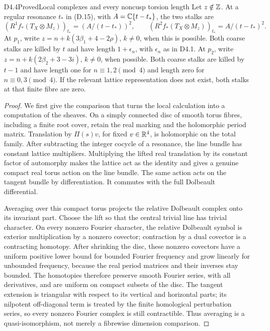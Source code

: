 \begin{claim}{D4.4}{Proved}{Local complexes and every noncusp torsion length}
Let $z\notin\mathbb Z$. At a regular resonance $t_*$ in (D.15), with
$A=\mathbb C\{t-t_*\}$, the two stalks are
\[
 (R^1f_*(T_X\otimes M_z))_{t_*}=(A/(t-t_*))^2,
 \qquad (R^2f_*(T_X\otimes M_z))_{t_*}=A/(t-t_*)^2.    \tag{D.18}
\]
At $p_1$, write $z=n+k(3\beta_1+4-2\rho)$, $k\ne0$, when this is
possible. Both coarse stalks are killed by $t$ and have length
$1+\epsilon_n$, with $\epsilon_n$ as in D4.1.
At $p_2$, write $z=n+k(2\beta_2+3-3i)$, $k\ne0$, when possible.
Both coarse stalks are killed by $t-1$ and have length one for
$n\equiv1,2\pmod4$ and length zero for $n\equiv0,3\pmod4$.
If the relevant lattice representation does not exist, both stalks
at that finite fibre are zero.
\end{claim}
\begin{proof}
We first give the comparison that turns the local calculation into
a computation of the sheaves. On a simply connected disc of smooth
torus fibres, including a finite root cover, retain the real marking
and the holomorphic period matrix. Translation by $\Pi(s)v$, for
fixed $v\in\mathbb R^4$, is holomorphic on the total family. After
subtracting the integer cocycle of a resonance, the line bundle has
constant lattice multipliers. Multiplying the lifted real translation
by its constant factor of automorphy makes the lattice act as the
identity and gives a genuine compact real torus action on the line
bundle. The same action acts on the tangent bundle by differentiation.
It commutes with the full Dolbeault differential.

Averaging over this compact torus projects the relative Dolbeault
complex onto its invariant part. Choose the lift so that the central
trivial line has trivial character. On every nonzero Fourier character,
the relative Dolbeault symbol is exterior multiplication by a
nonzero covector; contraction by a dual covector is a contracting
homotopy. After shrinking the disc, these nonzero covectors have a
uniform positive lower bound for bounded Fourier frequency and grow
linearly for unbounded frequency, because the real period matrices
and their inverses stay bounded. The homotopies therefore preserve
smooth Fourier series, with all derivatives, and are uniform on
compact subsets of the disc. The tangent extension is triangular
with respect to its vertical and horizontal parts; its nilpotent
off-diagonal term is treated by the finite homological perturbation
series, so every nonzero Fourier complex is still contractible.
Thus averaging is a quasi-isomorphism, not merely a fibrewise
dimension comparison.


\end{proof}
